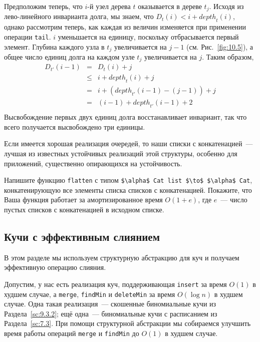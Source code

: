 \begin{theorem}
  Предположим теперь, что $i$-й узел дерева $t$ оказывается в дереве
  $t_j$. Исходя из лево-линейного инварианта долга, мы знаем, что
  $D_t(i) < i + \mathit{depth}_t(i)$, однако рассмотрим теперь, как
  каждая из величин изменяется при применении операции
  \lstinline!tail!. $i$ уменьшается на единицу, поскольку
  отбрасывается первый элемент. Глубина каждого узла в $t_j$
  увеличивается на $j-1$ (см. Рис.~\ref{fig:10.5}), а общее число
  единиц долга на каждом узле $t_j$ увеличивается на $j$. Таким
  образом,
  $$
  \begin{array}{lcl}
    D_{t'}(i-1) & = & D_t(i) + j \\
                & \le & i + \mathit{depth}_t(i) + j \\
                & = & i + (\mathit{depth}_{t'}(i-1) - (j-1)) + j \\
                & = & (i-1) + \mathit{depth}_{t'}(i-1) + 2 \\
  \end{array}
  $$
  Высвобождение первых двух единиц долга восстанавливает инвариант,
  так что всего получается высвобождено три единицы.
\end{theorem}

\begin{hint}
  Если имеется хорошая реализация очередей, то наши списки с
  конкатенацией~--- лучшая из известных устойчивых реализаций этой структуры, особенно
  для приложений, существенно опирающихся на устойчивость.
\end{hint}

\begin{exercise}\label{ex:10.6}
  Напишите функцию \lstinline!flatten! с типом 
  \lstinline!$\alpha$ Cat list $\to$ $\alpha$ Cat!, конкатенирующую
  все элементы списка списков с конкатенацией. Покажите, что Ваша
  функция работает за амортизированное время $O(1+e)$, где $e$~---
  число пустых списков с конкатенацией в исходном списке.
\end{exercise}

\subsection{Кучи с эффективным слиянием}
\label{sc:10.2.2}

В этом разделе мы используем структурную абстракцию для куч и получаем
эффективную операцию слияния.

Допустим, у нас есть реализация куч, поддерживающая \lstinline!insert!
за время $O(1)$ в худшем случае, а \lstinline!merge!,
\lstinline!findMin! и \lstinline!deleteMin! за время $O(\log n)$ в
худшем случае. Одна такая реализация~--- скошенные биномиальные кучи
из Раздела~\ref{sc:9.3.2}; ещё одна~--- биномиальные кучи с
расписанием из Раздела~\ref{sc:7.3}. При помощи структурной абстракции
мы собираемся улучшить время работы операций \lstinline!merge! и
\lstinline!findMin! до $O(1)$ в худшем случае.

